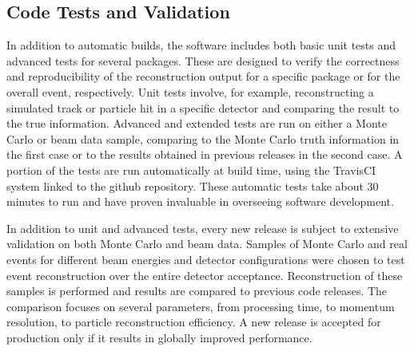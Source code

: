 \subsection{Code Tests and Validation}
\label{sec:tests}

In addition to automatic builds, the software includes both basic unit tests and advanced tests for several
packages. These are designed to verify the correctness and reproducibility of the reconstruction output for a
specific package or for the overall event, respectively. Unit tests involve, for example, reconstructing a simulated
track or particle hit in a specific detector and comparing the result to the true information. Advanced and extended
tests are run on either a Monte Carlo or beam data sample, comparing to the Monte Carlo truth information in the first
case or to the results obtained in previous releases in the second case. A portion of the tests are run automatically
at build time, using the TravisCI system linked to the github repository.  These automatic tests take about 30
minutes to run and have proven invaluable in overseeing software development.

In addition to unit and advanced tests, every new release is subject to extensive validation on both Monte Carlo and
beam data. Samples of Monte Carlo and real events for different beam energies and detector configurations were
chosen to test event reconstruction over the entire detector acceptance. Reconstruction of these samples is
performed and results are compared to previous code releases. The comparison focuses on several parameters, from
processing time, to momentum resolution, to particle reconstruction efficiency. A new release is accepted for
production only if it results in globally improved performance. 
